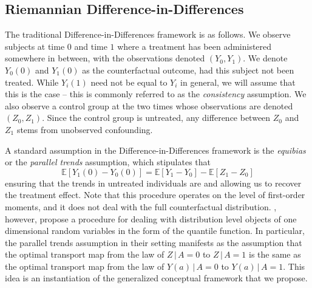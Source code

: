 \documentclass[11pt]{article}
\begin{document}
\subsection{Riemannian Difference-in-Differences}
The traditional Difference-in-Differences framework is as follows. We observe subjects at time $0$ and time $1$ where a treatment has been administered somewhere in between, with the observations denoted $(Y_0, Y_1)$. We denote $Y_0(0)$ and $Y_1(0)$ as the counterfactual outcome, had this subject not been treated. While $Y_i(1)$ need not be equal to $Y_i$ in general, we will assume that this is the case -- this is commonly referred to as the \textit{consistency} assumption. We also observe a control group at the two times whose observations are denoted $(Z_0, Z_1).$ Since the control group is untreated, any difference between $Z_0$ and $Z_1$ stems from unobserved confounding. 

A standard assumption in the Difference-in-Differences framework is the \textit{equibias} or the \textit{parallel trends} assumption, which stipulates that 
\[\mathbb{E}[Y_1(0) - Y_0(0)] = \mathbb{E}[Y_1 - Y_0] - \mathbb{E}[Z_1 - Z_0]\]
ensuring that the trends in untreated individuals are  \cite{abadie2005semiparametric} and allowing us to recover the treatment effect. Note that this procedure operates on the level of first-order moments, and it does not deal with the full counterfactual distribution. \citet{sofer2016}, however, propose a procedure for dealing with distribution level objects of one dimensional random variables in the form of the quantile function. In particular, the parallel trends assumption in their setting manifests as the assumption that the optimal transport map from the law of $Z \,| \, A = 0$ to $Z \, | \, A = 1$ is the same as the optimal transport map from the law of $Y(a) \, | \,A = 0$ to $Y(a) \, | \,A = 1.$ This idea is an instantiation of the generalized conceptual framework that we propose.
\end{document}
